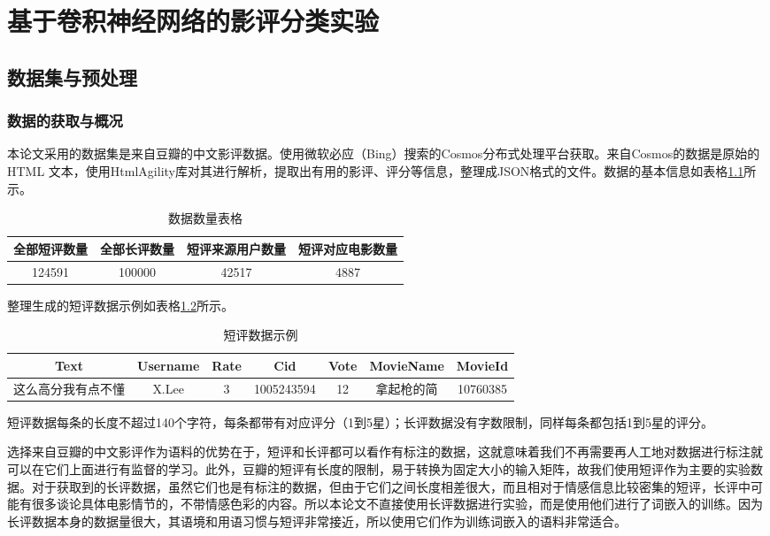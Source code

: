 \chapter{基于卷积神经网络的影评分类实验}
\section{数据集与预处理}
\subsection{数据的获取与概况}
本论文采用的数据集是来自豆瓣的中文影评数据。使用微软必应（Bing）搜索的Cosmos分布式处理平台获取。来自Cosmos的数据是原始的HTML 文本，使用HtmlAgility库对其进行解析，提取出有用的影评、评分等信息，整理成JSON格式的文件。数据的基本信息如表格\ref{tab:comment count}所示。

\begin{table}[H]
\centering
\caption{数据数量表格} \label{tab:comment count}
\begin{tabular}{c|c|c|c}
    \hline
    全部短评数量 & 全部长评数量 & 短评来源用户数量 & 短评对应电影数量\\
    \hline
    124591 & 100000 & 42517 & 4887\\
    \hline
\end{tabular}
\end{table}

整理生成的短评数据示例如表格\ref{tab:comment format}所示。
\begin{table}[H]
\centering
\caption{短评数据示例} \label{tab:comment format}
\begin{tabular}{c|c|c|c|c|c|c}
    \hline
    Text & Username & Rate & Cid & Vote & MovieName & MovieId\\
    \hline
    这么高分我有点不懂 & X.Lee & 3 & 1005243594 & 12 & 拿起枪的简 & 10760385\\
    \hline
\end{tabular}
\end{table}

短评数据每条的长度不超过140个字符，每条都带有对应评分（1到5星）；长评数据没有字数限制，同样每条都包括1到5星的评分。

选择来自豆瓣的中文影评作为语料的优势在于，短评和长评都可以看作有标注的数据，这就意味着我们不再需要再人工地对数据进行标注就可以在它们上面进行有监督的学习。此外，豆瓣的短评有长度的限制，易于转换为固定大小的输入矩阵，故我们使用短评作为主要的实验数据。对于获取到的长评数据，虽然它们也是有标注的数据，但由于它们之间长度相差很大，而且相对于情感信息比较密集的短评，长评中可能有很多谈论具体电影情节的，不带情感色彩的内容。所以本论文不直接使用长评数据进行实验，而是使用他们进行了词嵌入的训练。因为长评数据本身的数据量很大，其语境和用语习惯与短评非常接近，所以使用它们作为训练词嵌入的语料非常适合。

